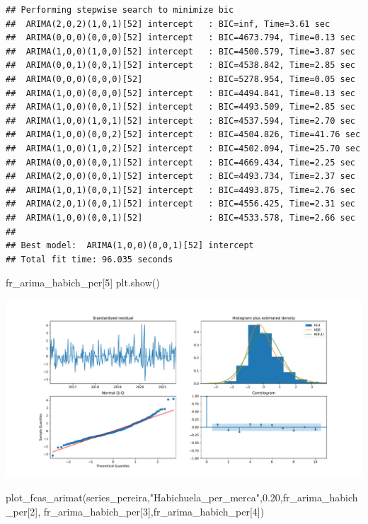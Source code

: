\documentclass[
]{book}
\newenvironment{Shaded}{\begin{snugshade}}{\end{snugshade}}
\newcommand{\DecValTok}[1]{\textcolor[rgb]{0.00,0.00,0.81}{#1}}
\newcommand{\FloatTok}[1]{\textcolor[rgb]{0.00,0.00,0.81}{#1}}
\newcommand{\NormalTok}[1]{#1}
\newcommand{\StringTok}[1]{\textcolor[rgb]{0.31,0.60,0.02}{#1}}
\begin{document}
\begin{verbatim}
## Performing stepwise search to minimize bic
##  ARIMA(2,0,2)(1,0,1)[52] intercept   : BIC=inf, Time=3.61 sec
##  ARIMA(0,0,0)(0,0,0)[52] intercept   : BIC=4673.794, Time=0.13 sec
##  ARIMA(1,0,0)(1,0,0)[52] intercept   : BIC=4500.579, Time=3.87 sec
##  ARIMA(0,0,1)(0,0,1)[52] intercept   : BIC=4538.842, Time=2.85 sec
##  ARIMA(0,0,0)(0,0,0)[52]             : BIC=5278.954, Time=0.05 sec
##  ARIMA(1,0,0)(0,0,0)[52] intercept   : BIC=4494.841, Time=0.13 sec
##  ARIMA(1,0,0)(0,0,1)[52] intercept   : BIC=4493.509, Time=2.85 sec
##  ARIMA(1,0,0)(1,0,1)[52] intercept   : BIC=4537.594, Time=2.70 sec
##  ARIMA(1,0,0)(0,0,2)[52] intercept   : BIC=4504.826, Time=41.76 sec
##  ARIMA(1,0,0)(1,0,2)[52] intercept   : BIC=4502.094, Time=25.70 sec
##  ARIMA(0,0,0)(0,0,1)[52] intercept   : BIC=4669.434, Time=2.25 sec
##  ARIMA(2,0,0)(0,0,1)[52] intercept   : BIC=4493.734, Time=2.37 sec
##  ARIMA(1,0,1)(0,0,1)[52] intercept   : BIC=4493.875, Time=2.76 sec
##  ARIMA(2,0,1)(0,0,1)[52] intercept   : BIC=4556.425, Time=2.31 sec
##  ARIMA(1,0,0)(0,0,1)[52]             : BIC=4533.578, Time=2.66 sec
## 
## Best model:  ARIMA(1,0,0)(0,0,1)[52] intercept
## Total fit time: 96.035 seconds
\end{verbatim}

\begin{Shaded}
\begin{Highlighting}[]
\NormalTok{fr\_arima\_habich\_per[}\DecValTok{5}\NormalTok{]}
\NormalTok{plt.show()}
\end{Highlighting}
\end{Shaded}

\includegraphics{bookdown-demo_files/figure-latex/unnamed-chunk-166-161.pdf}

\begin{Shaded}
\begin{Highlighting}[]

\NormalTok{plot\_fcas\_arimat(series\_pereira,}\StringTok{"Habichuela\_per\_merca"}\NormalTok{,}\FloatTok{0.20}\NormalTok{,fr\_arima\_habich\_per[}\DecValTok{2}\NormalTok{],}
\NormalTok{fr\_arima\_habich\_per[}\DecValTok{3}\NormalTok{],fr\_arima\_habich\_per[}\DecValTok{4}\NormalTok{])}
\end{Highlighting}
\end{Shaded}
\end{document}

